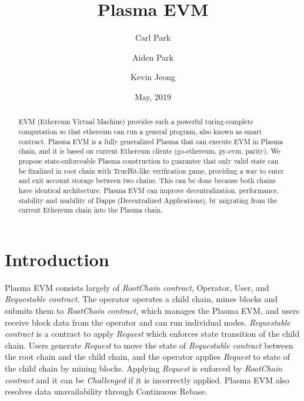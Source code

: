 \documentclass[letterpaper, 11pt]{article}
\title{Plasma EVM}
\author[1]{Carl Park}
\author[1]{Aiden Park}
\author[1]{Kevin Jeong}
\affil[1]{Onther Inc.}
\date{May, 2019}
\begin{document}
\maketitle

\begin{abstract}
\begin{CJK}{UTF8}{mj}
EVM (Ethereum Virtual Machine) provides such a powerful turing-complete computation so that ethereum can run a general program, also known as smart contract. Plasma EVM is a fully generalized Plasma that can execute EVM in Plasma chain, and it is based on current Ethereum clients (go-ethereum, py-evm, parity). We propose state-enforceable Plasma construction to guarantee that only valid state can be finalized in root chain with TrueBit-like verification game, providing a way to enter and exit account storage between two chains. This can be done because both chains have identical architecture. Plasma EVM can improve decentralization, performance, stability and usability of Dapps (Decentralized Applications), by migrating from the current Ethereum chain into the Plasma chain. \\

\end{CJK}
\end{abstract}

\section{Introduction} \label{sec:childchain}
\begin{CJK}{UTF8}{mj}
Plasma EVM consists largely of \emph{RootChain contract}, Operator, User, and \emph{Requestable contract}. The operator operates a child chain, mines blocks and submits them to \emph{RootChain contract}, which manages the Plasma EVM, and users receive block data from the operator and can run individual nodes. \emph{Requestable contract} is a contract to apply \emph{Request} which enforces state transition of the child chain. Users generate \emph{Request} to move the state of \emph{Requestable contract} between the root chain and the child chain, and the operator applies \emph{Request} to state of the child chain by mining blocks. Applying \emph{Request} is enforced by \emph{RootChain contract} and it can be \emph{Challenged} if it is incorrectly applied. Plasma EVM also resolves data unavailability through Continuous Rebase.


\end{CJK}
\end{document}
